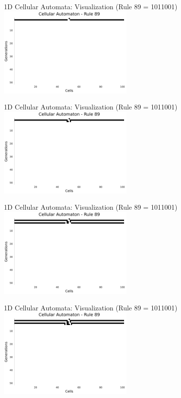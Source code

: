 \begin{frame}{1D Cellular Automata: Visualization (Rule 89 = 1011001)}
    \centering
    \includegraphics[width=0.5\textwidth]{../paper/figures/carule89_step1}
\end{frame}

\begin{frame}{1D Cellular Automata: Visualization (Rule 89 = 1011001)}
    \centering
    \includegraphics[width=0.5\textwidth]{../paper/figures/carule89_step2}
\end{frame}

\begin{frame}{1D Cellular Automata: Visualization (Rule 89 = 1011001)}
    \centering
    \includegraphics[width=0.5\textwidth]{../paper/figures/carule89_step3}
\end{frame}

\begin{frame}{1D Cellular Automata: Visualization (Rule 89 = 1011001)}
    \centering
    \includegraphics[width=0.5\textwidth]{../paper/figures/carule89_step4}
\end{frame}

